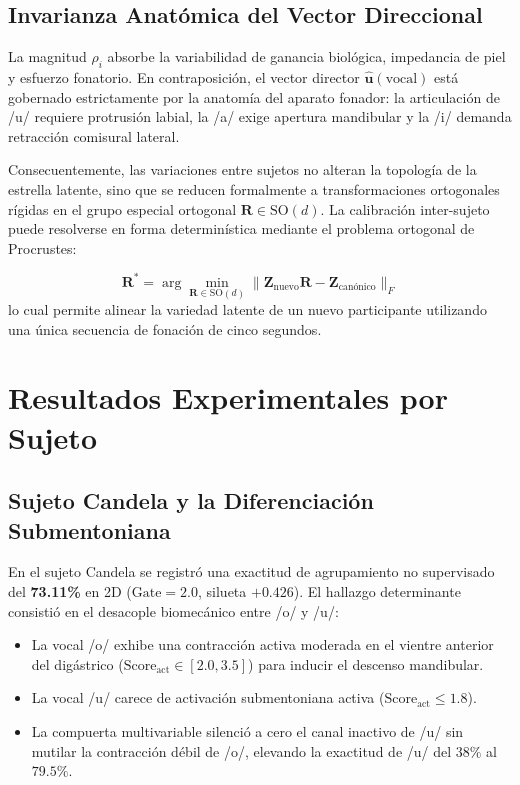 \documentclass[11pt,a4paper,openany]{book}
\theoremstyle{definition}
\begin{document}
\subsection{Invarianza Anatómica del Vector Direccional}
\label{subsec:invarianza_vectorial}

La magnitud $\rho_i$ absorbe la variabilidad de ganancia biológica, impedancia de piel y esfuerzo fonatorio. En contraposición, el vector director $\hat{\mathbf{u}}(\text{vocal})$ está gobernado estrictamente por la anatomía del aparato fonador: la articulación de /u/ requiere protrusión labial, la /a/ exige apertura mandibular y la /i/ demanda retracción comisural lateral. 

Consecuentemente, las variaciones entre sujetos no alteran la topología de la estrella latente, sino que se reducen formalmente a transformaciones ortogonales rígidas en el grupo especial ortogonal $\mathbf{R} \in \text{SO}(d)$. La calibración inter-sujeto puede resolverse en forma determinística mediante el problema ortogonal de Procrustes:

\begin{equation}
    \mathbf{R}^* = \arg\min_{\mathbf{R} \in \text{SO}(d)} \|\mathbf{Z}_{\text{nuevo}} \mathbf{R} - \mathbf{Z}_{\text{canónico}}\|_F
    \label{eq:procrustes}
\end{equation}
lo cual permite alinear la variedad latente de un nuevo participante utilizando una única secuencia de fonación de cinco segundos.

\section{Resultados Experimentales por Sujeto}
\label{sec:resultados_sujetos}

\subsection{Sujeto Candela y la Diferenciación Submentoniana}
\label{subsec:resultados_candela}

En el sujeto Candela se registró una exactitud de agrupamiento no supervisado del \textbf{73.11\%} en 2D ($\text{Gate} = 2.0$, silueta $+0.426$). El hallazgo determinante consistió en el desacople biomecánico entre /o/ y /u/:
\begin{itemize}
    \item La vocal /o/ exhibe una contracción activa moderada en el vientre anterior del digástrico ($\text{Score}_{\text{act}} \in [2.0, 3.5]$) para inducir el descenso mandibular.
    \item La vocal /u/ carece de activación submentoniana activa ($\text{Score}_{\text{act}} \le 1.8$).
    \item La compuerta multivariable silenció a cero el canal inactivo de /u/ sin mutilar la contracción débil de /o/, elevando la exactitud de /u/ del $38\%$ al $79.5\%$.
\end{itemize}
\end{document}
